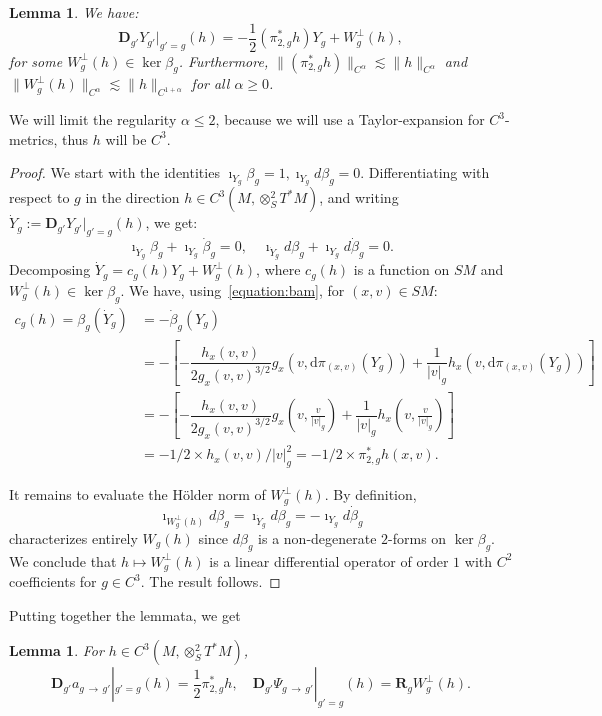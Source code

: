 \documentclass[10pt]{amsart}
\newtheorem{lemm}[theo]{Lemma}\newtheorem{prop}[theo]{Proposition}\newtheorem{coro}[theo]{Corollary}\newtheorem{conj}[theo]{Conjecture}
\theoremstyle{definition}\newtheorem{defi}[theo]{Definition}\newtheorem{rema}[theo]{Remark}\newtheorem{exam}[theo]{Example}\newtheorem{exem}[theo]{Example}\newtheorem{nota}[theo]{Notation}
\newcommand{\RR}{\mathbf{R}}
\newcommand{\bdD}{\mathbf{D}}
\newcommand{\dd}{\mathrm{d}}
\begin{document}
\begin{lemm}\label{lemma:diff}
We have:
\[
\bdD_{g'} Y_{g'}|_{g'=g} (h) = -\frac{1}{2} \left(\pi_{2,g}^\ast h\right) Y_g + W_g^\perp(h),
\]
for some $W_g^\perp(h) \in \ker \beta_g$. Furthermore, $\|(\pi_{2,g}^\ast h)\|_{C^\alpha} \lesssim \|h\|_{C^\alpha}$ and $\|W_g^\perp(h)\|_{C^\alpha} \lesssim \|h\|_{C^{1+\alpha}}$ for all $\alpha \geq 0$.
\end{lemm}

We will limit the regularity $\alpha \leq 2$, because we will use a Taylor-expansion for $C^3$-metrics, thus $h$ will be $C^3$.

\begin{proof}
We start with the identities $\imath_{Y_g} \beta_g = 1, \imath_{Y_g} d \beta_g = 0$. Differentiating with respect to $g$ in the direction $h \in C^3(M,\otimes^2_S T^*M)$, and writing $\dot{Y}_g := \bdD_{g'} Y_{g'}|_{g'=g} (h)$, we get:
\[
\imath_{\dot{Y}_g} \beta_g + \imath_{Y_g} \dot{\beta}_g = 0,\quad\imath_{\dot{Y}_g} d \beta_g + \imath_{Y_g} d \dot{\beta}_g = 0.
\]
Decomposing $\dot{Y}_g = c_g(h)Y_g + W_g^\perp(h)$, where $c_g(h)$ is a function on $SM$ and $W_g^\perp(h) \in \ker \beta_g$. We have, using~\eqref{equation:bam}, for $(x,v) \in SM$:
\begin{align*}
c_g(h) = \beta_g(\dot{Y}_g) &= - \dot{\beta}_g(Y_g)\\
& =- \left[-\dfrac{h_x(v,v)}{2g_x(v,v)^{3/2}} g_x\left(v, \dd \pi_{(x,v)}(Y_g)\right) + \dfrac{1}{|v|_g} h_x\left(v, \dd \pi_{(x,v)}(Y_g)\right) \right]\\
& = - \left[-\dfrac{h_x(v,v)}{2g_x(v,v)^{3/2}} g_x\left(v, \frac{v}{|v|_g}\right) + \dfrac{1}{|v|_g} h_x\left(v, \frac{v}{|v|_g}\right) \right]\\
& = -1/2 \times h_x(v,v) /|v|_g^2 = -1/2 \times \pi_{2,g}^\ast h(x,v).
\end{align*}

It remains to evaluate the H\"older norm of $W^\perp_g(h)$. By definition,
\[
\imath_{W_g^\perp(h)} d \beta_g = \imath_{\dot{Y}_g} d \beta_g =- \imath_{Y_g} d \dot{\beta}_g
\]
characterizes entirely $W_g(h)$ since $d\beta_g$ is a non-degenerate $2$-forms on $\ker \beta_g$. We conclude that $h\mapsto W_g^\perp(h)$ is a linear differential operator of order $1$ with $C^2$ coefficients for $g\in C^3$. The result follows.
\end{proof}

Putting together the lemmata, we get
\begin{lemm}\label{lemma:derivative-0}
For $h\in C^3(M,\otimes^2_S T^\ast M)$,
\begin{equation}\label{eq:derivative-at-g-conjugation}
\bdD_{g'} a_{g\,\to\,g'}|_{g'=g}(h) = \frac{1}{2}\pi_{2,g}^\ast h,\quad \bdD_{g'} \Psi_{g\,\to\,g'}|_{g'=g}(h) = \RR_g W_g^\perp(h).
\end{equation}
\end{lemm}
\end{document}
